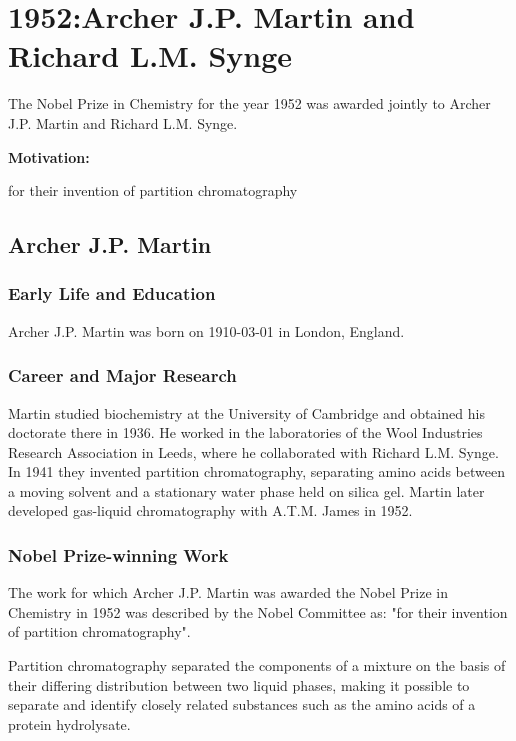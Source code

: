 \chapter{1952:Archer J.P. Martin and Richard L.M. Synge}

\label{chap:chemistry1952}

The Nobel Prize in Chemistry for the year 1952 was awarded jointly to Archer J.P. Martin and Richard L.M. Synge.

\textbf{Motivation:}

for their invention of partition chromatography

\section{Archer J.P. Martin}

\subsection*{Early Life and Education}

Archer J.P. Martin was born on 1910-03-01 in London, England.

\subsection*{Career and Major Research}

Martin studied biochemistry at the University of Cambridge and obtained his doctorate there in 1936. He worked in the laboratories of the Wool Industries Research Association in Leeds, where he collaborated with Richard L.M. Synge. In 1941 they invented partition chromatography, separating amino acids between a moving solvent and a stationary water phase held on silica gel. Martin later developed gas-liquid chromatography with A.T.M. James in 1952.

\subsection*{Nobel Prize-winning Work}

The work for which Archer J.P. Martin was awarded the Nobel Prize in Chemistry in 1952 was described by the Nobel Committee as: "for their invention of partition chromatography".

Partition chromatography separated the components of a mixture on the basis of their differing distribution between two liquid phases, making it possible to separate and identify closely related substances such as the amino acids of a protein hydrolysate.

